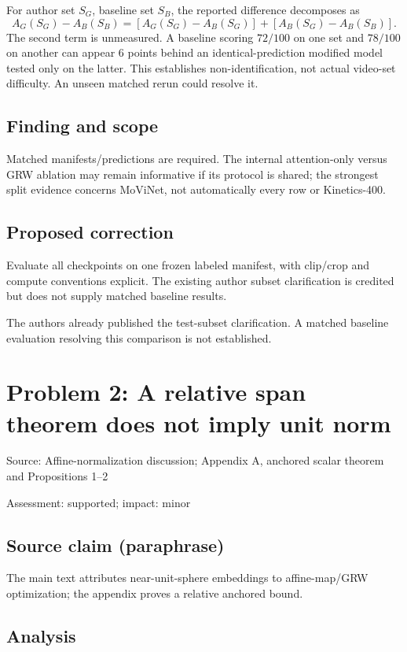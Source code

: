 \documentclass[11pt]{article}
\begin{document}
For author set \(S_G\), baseline set \(S_B\), the reported difference decomposes as \[A_G(S_G)-A_B(S_B)=[A_G(S_G)-A_B(S_G)]+[A_B(S_G)-A_B(S_B)].\] The second term is unmeasured. A baseline scoring \(72/100\) on one set and \(78/100\) on another can appear \(6\) points behind an identical-prediction modified model tested only on the latter. This establishes non-identification, not actual video-set difficulty. An unseen matched rerun could resolve it.

\subsection*{Finding and scope}

Matched manifests/predictions are required. The internal attention-only versus GRW ablation may remain informative if its protocol is shared; the strongest split evidence concerns MoViNet, not automatically every row or Kinetics-400.

\subsection*{Proposed correction}

Evaluate all checkpoints on one frozen labeled manifest, with clip/crop and compute conventions explicit. The existing author subset clarification is credited but does not supply matched baseline results.

The authors already published the test-subset clarification. A matched baseline evaluation resolving this comparison is not established.

\section*{Problem 2: A relative span theorem does not imply unit norm}

Source: Affine-normalization discussion; Appendix A, anchored scalar theorem and Propositions 1–2

Assessment: supported; impact: minor

\subsection*{Source claim (paraphrase)}

The main text attributes near-unit-sphere embeddings to affine-map/GRW optimization; the appendix proves a relative anchored bound.

\subsection*{Analysis}
\end{document}
